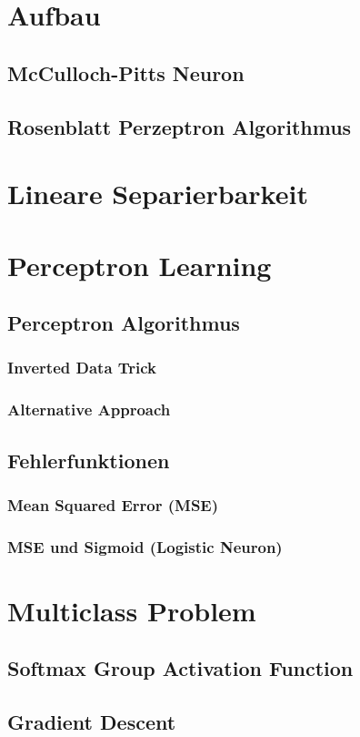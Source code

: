 \section*{Aufbau}

\subsection*{McCulloch-Pitts Neuron}

\subsection*{Rosenblatt Perzeptron Algorithmus}

\section*{Lineare Separierbarkeit}

\section*{Perceptron Learning}

\subsection*{Perceptron Algorithmus}

\subsubsection*{Inverted Data Trick}

\subsubsection*{Alternative Approach}

\subsection*{Fehlerfunktionen}
\subsubsection*{Mean Squared Error (MSE)}
\subsubsection*{MSE und Sigmoid (Logistic Neuron)}


\section*{Multiclass Problem}

\subsection*{Softmax Group Activation Function}

\subsection*{Gradient Descent}